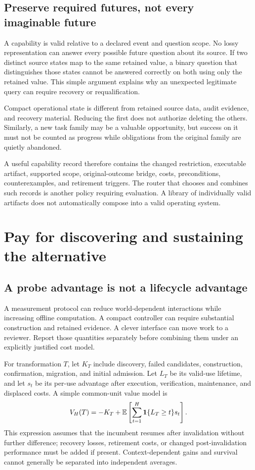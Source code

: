 \documentclass[11pt,letterpaper]{article}
\newcommand{\E}{\mathbb E}\newcommand{\Prob}{\mathbb P}
\theoremstyle{remark}\newtheorem{remark}{Remark}[section]
\begin{document}
\subsection{Preserve required futures, not every imaginable future}
A capability is valid relative to a declared event and question scope. No lossy representation can answer every possible future question about its source. If two distinct source states map to the same retained value, a binary question that distinguishes those states cannot be answered correctly on both using only the retained value. This simple argument explains why an unexpected legitimate query can require recovery or requalification.

Compact operational state is different from retained source data, audit evidence, and recovery material. Reducing the first does not authorize deleting the others. Similarly, a new task family may be a valuable opportunity, but success on it must not be counted as progress while obligations from the original family are quietly abandoned.

A useful capability record therefore contains the changed restriction, executable artifact, supported scope, original-outcome bridge, costs, preconditions, counterexamples, and retirement triggers. The router that chooses and combines such records is another policy requiring evaluation. A library of individually valid artifacts does not automatically compose into a valid operating system.

\section{Pay for discovering and sustaining the alternative}\label{sec:cost}
\subsection{A probe advantage is not a lifecycle advantage}
A measurement protocol can reduce world-dependent interactions while increasing offline computation. A compact controller can require substantial construction and retained evidence. A clever interface can move work to a reviewer. Report those quantities separately before combining them under an explicitly justified cost model.

For transformation $T$, let $K_T$ include discovery, failed candidates, construction, confirmation, migration, and initial admission. Let $L_T$ be its valid-use lifetime, and let $s_t$ be its per-use advantage after execution, verification, maintenance, and displaced costs. A simple common-unit value model is
\begin{equation}\label{eq:lifetime}
 V_H(T)=-K_T+\E\left[\sum_{t=1}^{H}\1\{L_T\ge t\}s_t\right].
\end{equation}
This expression assumes that the incumbent resumes after invalidation without further difference; recovery losses, retirement costs, or changed post-invalidation performance must be added if present. Context-dependent gains and survival cannot generally be separated into independent averages.
\end{document}

